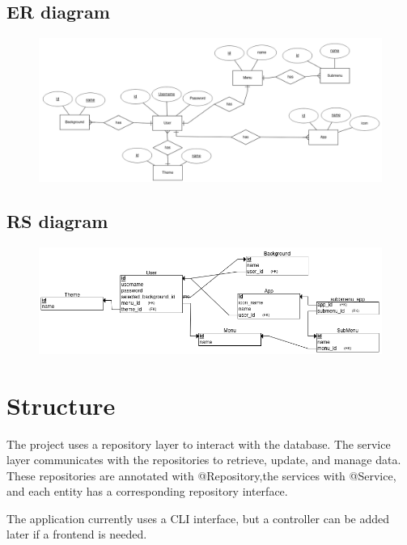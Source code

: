 \documentclass[12pt]{article}
\begin{document}
\subsection{ER diagram}
\begin{figure}[h!]
	\centering
	\includegraphics[width=1.2\textwidth]{er_model.png}
\end{figure}
\newpage
\subsection{RS diagram}
\begin{figure}[h!]
	\centering
	\includegraphics[width=1.2\textwidth]{rs.png}
\end{figure}

\section{Structure}
The project uses a repository layer to interact with the database. The service layer communicates with the repositories to retrieve, update, and manage data. These repositories are annotated with @Repository,the services with @Service, and each entity has a corresponding repository interface. 

The application currently uses a CLI interface, but a controller can be added later if a frontend is needed.

\newpage
\end{document}
